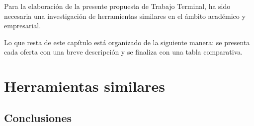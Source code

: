 Para la elaboración de la presente propuesta de Trabajo Terminal, ha sido necesaria una investigación de herramientas similares en el ámbito académico y empresarial.


Lo que resta de este capítulo está organizado de la siguiente manera: se presenta cada oferta con una breve descripción y se finaliza con una tabla comparativa.

\section{Herramientas similares}





\subsection{Conclusiones}

%
